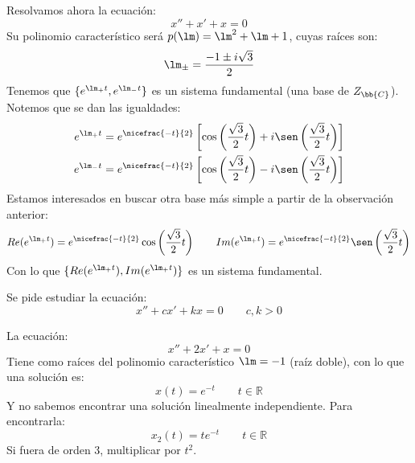 \begin{ejemplo}
    Resolvamos ahora la ecuación:
    \begin{equation*}
        x'' + x' + x = 0
    \end{equation*}
    Su polinomio característico será $p(\lm) = \lm^2 + \lm + 1$, cuyas raíces son:
    \begin{equation*}
        \lm_{\pm} = \dfrac{-1\pm i\sqrt{3}}{2}
    \end{equation*}
    Tenemos que $\{e^{\lm_+ t}, e^{\lm_- t}\}$ es un sistema fundamental (una base de $Z_{\bb{C}}$). Notemos que se dan las igualdades:
    \begin{align*}
        e^{\lm_+ t} = e^{\nicefrac{-t}{2}}\left[\cos\left(\dfrac{\sqrt{3}}{2}t\right)+i\sen\left(\dfrac{\sqrt{3}}{2}t\right)\right] \\
        e^{\lm_- t} = e^{\nicefrac{-t}{2}}\left[\cos\left(\dfrac{\sqrt{3}}{2}t\right)-i\sen\left(\dfrac{\sqrt{3}}{2}t\right)\right] 
    \end{align*}
    Estamos interesados en buscar otra base más simple a partir de la observación anterior:
    \begin{equation*}
        Re(e^{\lm_+ t}) = e^{\nicefrac{-t}{2}}\cos\left(\dfrac{\sqrt{3}}{2}t\right) \qquad 
        Im(e^{\lm_+ t}) = e^{\nicefrac{-t}{2}}\sen\left(\dfrac{\sqrt{3}}{2}t\right)
    \end{equation*}
    Con lo que $\{Re(e^{\lm_+ t}), Im(e^{\lm_+ t})\}$ es un sistema fundamental.
\end{ejemplo}

\begin{ejercicio*}
    Se pide estudiar la ecuación:
    \begin{equation*}
        x'' + cx' + kx = 0 \qquad c,k > 0
    \end{equation*}
\end{ejercicio*}

\begin{ejercicio*}
    La ecuación:
    \begin{equation*}
        x'' + 2x' + x = 0
    \end{equation*}
    Tiene como raíces del polinomio característico $\lm = -1$ (raíz doble), con lo que una solución es:
    \begin{equation*}
        x(t) = e^{-t} \qquad t\in \mathbb{R}
    \end{equation*}
    Y no sabemos encontrar una solución linealmente independiente. Para encontrarla:
    \begin{equation*}
        x_2(t) = te^{-t} \qquad t\in \mathbb{R}
    \end{equation*}
    Si fuera de orden 3, multiplicar por $t^2$.
\end{ejercicio*}
